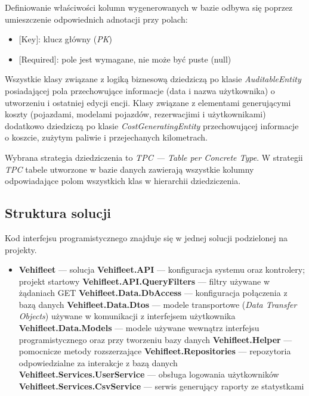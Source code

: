\documentclass[eng,printmode,openany]{mgr}
\begin{document}
	Definiowanie właściwości kolumn wygenerowanych w bazie odbywa się poprzez umieszczenie odpowiednich adnotacji przy polach:
	\begin{itemize}
		\item $[$Key$]$: klucz główny (\textit{PK})
		\item $[$Required$]$: pole jest wymagane, nie może być puste (null)
	\end{itemize}
	
	
	
	

	Wszystkie klasy związane z logiką biznesową dziedziczą po klasie \textit{AuditableEntity} posiadającej pola przechowujące informacje (data i nazwa użytkownika) o utworzeniu i ostatniej edycji encji. Klasy związane z elementami generującymi koszty (pojazdami, modelami pojazdów, rezerwacjimi i użytkownikami) dodatkowo dziedziczą po klasie \textit{CostGeneratingEntity} przechowującej informacje o koszcie, zużytym paliwie i przejechanych kilometrach. 
	
	Wybrana strategia dziedziczenia to \textit{TPC — Table per Concrete Type}. W strategii \textit{TPC} tabele utworzone w bazie danych zawierają wszystkie kolumny odpowiadające polom wszystkich klas w hierarchii dziedziczenia.
	
	
	
	
	
	\subsection{Struktura solucji}
	Kod interfejsu programistycznego znajduje się w jednej solucji podzielonej na projekty.
	\begin{itemize}
		\item \textbf{Vehifleet} — solucja
			\subitem \textbf{Vehifleet.API} — konfiguracja systemu oraz kontrolery; projekt startowy
			\subitem \textbf{Vehifleet.API.QueryFilters} — filtry używane w żądaniach GET
			\subitem \textbf{Vehifleet.Data.DbAccess} — konfiguracja połączenia z bazą danych
			\subitem \textbf{Vehifleet.Data.Dtos} — modele transportowe (\textit{Data Transfer Objects}) używane w komunikacji z interfejsem użytkownika
			\subitem \textbf{Vehifleet.Data.Models} — modele używane wewnątrz interfejsu programistycznego oraz przy tworzeniu bazy danych
			\subitem \textbf{Vehifleet.Helper} — pomocnicze metody rozszerzające \cite{msdn-extension}
			\subitem \textbf{Vehifleet.Repositories} — repozytoria odpowiedzialne za interakcje z bazą danych
			\subitem \textbf{Vehifleet.Services.UserService} — obsługa logowania użytkowników
			\subitem \textbf{Vehifleet.Services.CsvService} — serwis generujący raporty ze statystkami
	\end{itemize}
	
\end{document}
